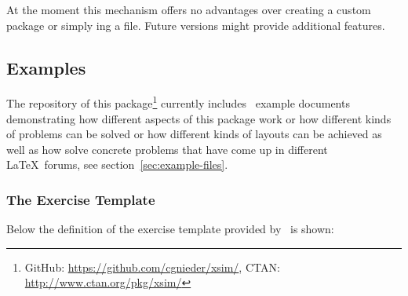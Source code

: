 \documentclass{xsim-manual}
\begin{document}
\begin{bewareofthedog}
  At the moment this mechanism offers no advantages over creating a custom
  package or simply ing a file.  Future versions might provide
  additional features.
\end{bewareofthedog}


\subsection{Examples}\label{sec:template-examples}

The repository of this package\footnote{GitHub:
  \url{https://github.com/cgnieder/xsim/}, CTAN:
  \url{http://www.ctan.org/pkg/xsim/}} currently includes
\theexamplefiles~example documents demonstrating how different aspects of this
package work or how different kinds of problems can be solved or how different
kinds of layouts can be achieved as well as how solve concrete problems that
have come up in different \LaTeX\ forums, see
section~\vref{sec:example-files}.

\subsubsection{The  Exercise Template}\label{sec:exercise-templ-default}

Below the definition of the  exercise
template provided by \xsim\ is shown:

\begin{sourcecode}
  {\par}
\end{sourcecode}
\end{document}
